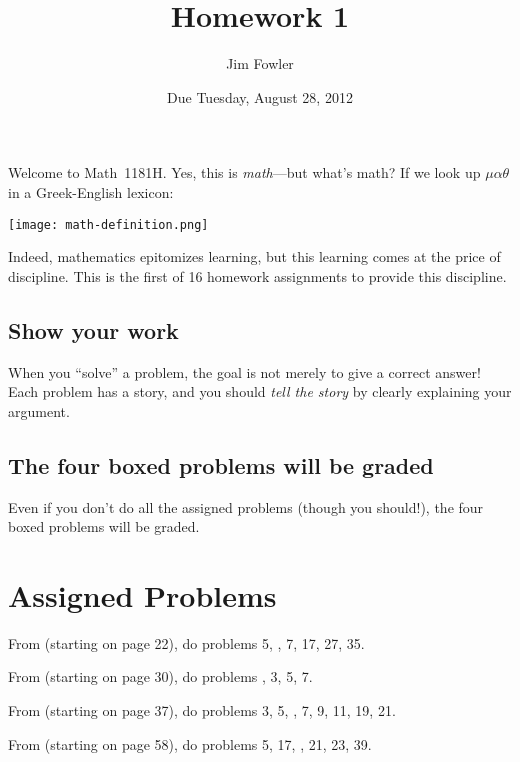 \documentclass[12pt]{handout}
\title{Homework 1}
\date{Due Tuesday, August 28, 2012}
\author{Jim Fowler}
\begin{document}
\maketitle

Welcome to Math~1181H.  Yes, this is \textit{math}---but what's math?
If we look up $\mu\alpha\theta$ in a Greek-English lexicon:
\begin{center}
\texttt{[image: math-definition.png]}
\end{center}
Indeed, mathematics epitomizes learning, but this learning comes at the price of discipline.  This is the first of 16 homework assignments to provide this discipline.







\subsection*{Show your work}
When you ``solve'' a problem, the goal is not merely to give a correct answer!  Each problem has a story, and you should \textit{tell the story} by clearly explaining your argument.


\subsection*{The four boxed problems will be graded}
Even if you don't do all the assigned problems (though you should!), the four boxed problems will be graded.

\section*{Assigned Problems}

From  (starting on page 22),
do problems 5, , 7, 17, 27, 35.
\vspace{1ex}

From  (starting on page 30),
do problems , 3, 5, 7.
\vspace{1ex}

From  (starting on page 37),
do problems 3, 5, , 7, 9, 11, 19, 21.
\vspace{1ex}

From  (starting on page 58),
do problems 5, 17, , 21, 23, 39.
\vspace{1ex}
\end{document}
